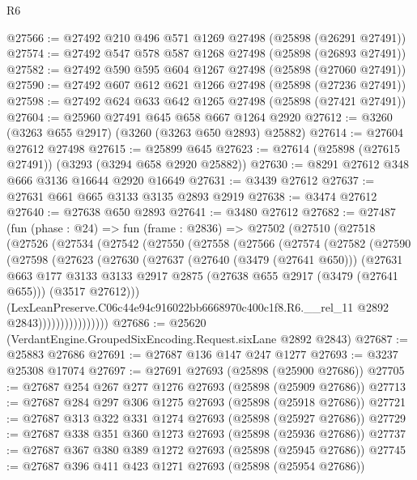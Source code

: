 \begin{lexlean}{R6}
\begin{coremodule}
@27566 := @27492 @210 @496 @571 @1269 @27498 (@25898 (@26291 @27491))
@27574 := @27492 @547 @578 @587 @1268 @27498 (@25898 (@26893 @27491))
@27582 := @27492 @590 @595 @604 @1267 @27498 (@25898 (@27060 @27491))
@27590 := @27492 @607 @612 @621 @1266 @27498 (@25898 (@27236 @27491))
@27598 := @27492 @624 @633 @642 @1265 @27498 (@25898 (@27421 @27491))
@27604 := @25960 @27491 @645 @658 @667 @1264 @2920
@27612 := @3260 (@3263 @655 @2917) (@3260 (@3263 @650 @2893) @25882)
@27614 := @27604 @27612 @27498
@27615 := @25899 @645
@27623 := @27614 (@25898 (@27615 @27491)) (@3293 (@3294 @658 @2920 @25882))
@27630 := @8291 @27612 @348 @666 @3136 @16644 @2920 @16649
@27631 := @3439 @27612
@27637 := @27631 @661 @665 @3133 @3135 @2893 @2919
@27638 := @3474 @27612
@27640 := @27638 @650 @2893
@27641 := @3480 @27612
@27682 := @27487
    (fun (phase : @24) =>
    fun (frame : @2836) =>
    @27502
      (@27510
        (@27518
          (@27526
            (@27534
              (@27542
                (@27550
                  (@27558
                    (@27566
                      (@27574
                        (@27582
                          (@27590
                            (@27598
                              (@27623
                                (@27630
                                  (@27637
                                    (@27640 (@3479 (@27641 @650)))
                                    (@27631
                                      @663
                                      @177
                                      @3133
                                      @3133
                                      @2917
                                      @2875
                                      (@27638 @655 @2917 (@3479 (@27641 @655)))
                                      (@3517 @27612)))
                                  (LexLeanPreserve.C06c44e94c916022bb6668970c400c1f8.R6.__rel_11
                                    @2892
                                    @2843))))))))))))))))
@27686 := @25620 (VerdantEngine.GroupedSixEncoding.Request.sixLane @2892 @2843)
@27687 := @25883 @27686
@27691 := @27687 @136 @147 @247 @1277
@27693 := @3237 @25308 @17074
@27697 := @27691 @27693 (@25898 (@25900 @27686))
@27705 := @27687 @254 @267 @277 @1276 @27693 (@25898 (@25909 @27686))
@27713 := @27687 @284 @297 @306 @1275 @27693 (@25898 (@25918 @27686))
@27721 := @27687 @313 @322 @331 @1274 @27693 (@25898 (@25927 @27686))
@27729 := @27687 @338 @351 @360 @1273 @27693 (@25898 (@25936 @27686))
@27737 := @27687 @367 @380 @389 @1272 @27693 (@25898 (@25945 @27686))
@27745 := @27687 @396 @411 @423 @1271 @27693 (@25898 (@25954 @27686))

\end{coremodule}
\end{lexlean}
